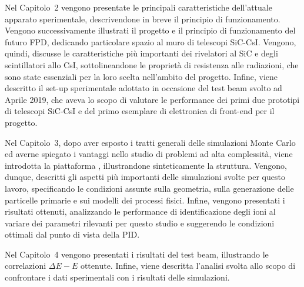Nel Capitolo~2 vengono presentate le principali caratteristiche dell'attuale apparato sperimentale, descrivendone in breve il principio di funzionamento.
Vengono successivamente illustrati il progetto e il principio di funzionamento del futuro FPD, dedicando particolare spazio al muro di telescopi SiC-CsI.
Vengono, quindi, discusse le caratteristiche più importanti dei rivelatori al SiC e degli scintillatori allo CsI, sottolineandone le proprietà di resistenza alle radiazioni, che sono state essenziali per la loro scelta nell'ambito del progetto.
Infine, viene descritto il set-up sperimentale adottato in occasione del test beam svolto ad Aprile 2019, che aveva lo scopo di valutare le performance dei primi due prototipi di telescopi SiC-CsI e del primo esemplare di elettronica di front-end per il progetto.

Nel Capitolo~3, dopo aver esposto i tratti generali delle simulazioni Monte Carlo ed averne spiegato i vantaggi nello studio di problemi ad alta complessità, viene introdotta la piattaforma \geant{}, illustrandone sinteticamente la struttura.
Vengono, dunque, descritti gli aspetti più importanti delle simulazioni svolte per questo lavoro, specificando le condizioni assunte sulla geometria, sulla generazione delle particelle primarie e sui modelli dei processi fisici.
Infine, vengono presentati i risultati ottenuti, analizzando le performance di identificazione degli ioni al variare dei parametri rilevanti per questo studio e suggerendo le condizioni ottimali dal punto di vista della PID.
 
Nel Capitolo~4 vengono presentati i risultati del test beam, illustrando le correlazioni $\Delta E - E$ ottenute.
Infine, viene descritta l'analisi svolta allo scopo di confrontare i dati sperimentali con i risultati delle simulazioni.

